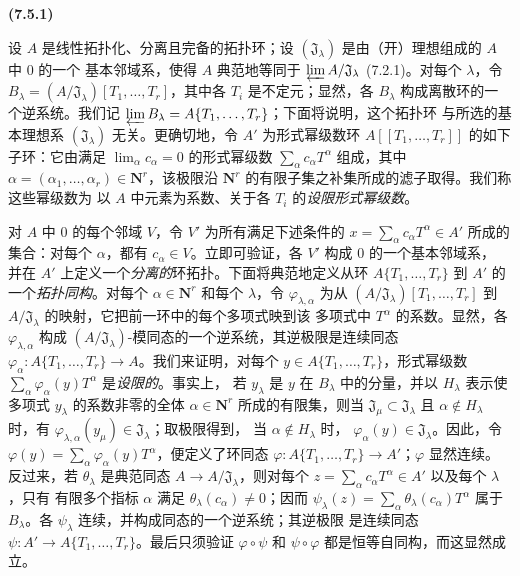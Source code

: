 \documentclass[UTF8,fontset=none,11pt,oneside,openany]{ctexbook}
\newenvironment{env}[1][]{%
  \par\medskip\noindent\textbf{(#1)}\ %
}{\par}
\newcommand{\oldpage}[2][]{%
  \hypertarget{ega-source-page-#1-#2}{}%
  \marginnote{\scriptsize\textbf{#1}~|~#2}\ignorespaces}
\let\EGAOriginalLabel\label
\renewcommand{\label}[1]{\phantomsection\EGAOriginalLabel{#1}}
\begin{document}
\begin{env}[7.5.1]
\label{0.7.5.1-fr}
设 $A$ 是线性拓扑化、分离且完备的拓扑环；设
$(\mathfrak J_\lambda)$ 是由（开）理想组成的 $A$ 中 $0$ 的一个
基本邻域系，使得 $A$ 典范地等同于
$\varprojlim A/\mathfrak J_\lambda$ (7.2.1)。对每个 $\lambda$，令
$B_\lambda=(A/\mathfrak J_\lambda)[T_1,\ldots,T_r]$，其中各 $T_i$
是不定元；显然，各 $B_\lambda$ 构成离散环的一个逆系统。我们记
$\varprojlim B_\lambda=A\{T_1,\ldots,T_r\}$；下面将说明，这个拓扑环
与所选的基本理想系 $(\mathfrak J_\lambda)$ 无关。更确切地，令 $A'$
为形式幂级数环 $A[\![T_1,\ldots,T_r]\!]$ 的如下子环：它由满足
$\lim_\alpha c_\alpha=0$ 的形式幂级数
$\sum_\alpha c_\alpha T^\alpha$ 组成，其中
$\alpha=(\alpha_1,\ldots,\alpha_r)\in\mathbf{N}^r$，该极限沿
$\mathbf{N}^r$ 的有限子集之补集所成的滤子取得。我们称这些幂级数为
以 $A$ 中元素为系数、关于各 $T_i$ 的\emph{设限形式幂级数}。

\oldpage[0\textsubscript{I}]{70}

对 $A$ 中 $0$ 的每个邻域 $V$，令 $V'$ 为所有满足下述条件的
$x=\sum_\alpha c_\alpha T^\alpha\in A'$ 所成的集合：对每个 $\alpha$，都有
$c_\alpha\in V$。立即可验证，各 $V'$ 构成 $0$ 的一个基本邻域系，
并在 $A'$ 上定义一个\emph{分离的}环拓扑。下面将典范地定义从环
$A\{T_1,\ldots,T_r\}$ 到 $A'$ 的一个\emph{拓扑同构}。对每个
$\alpha\in\mathbf{N}^r$ 和每个 $\lambda$，令
$\varphi_{\lambda,\alpha}$ 为从
$(A/\mathfrak J_\lambda)[T_1,\ldots,T_r]$ 到
$A/\mathfrak J_\lambda$ 的映射，它把前一环中的每个多项式映到该
多项式中 $T^\alpha$ 的系数。显然，各 $\varphi_{\lambda,\alpha}$
构成 $(A/\mathfrak J_\lambda)$-模同态的一个逆系统，其逆极限是连续同态
$\varphi_\alpha:A\{T_1,\ldots,T_r\}\to A$。我们来证明，对每个
$y\in A\{T_1,\ldots,T_r\}$，形式幂级数
$\sum_\alpha\varphi_\alpha(y)T^\alpha$ 是\emph{设限的}。事实上，
若 $y_\lambda$ 是 $y$ 在 $B_\lambda$ 中的分量，并以 $H_\lambda$
表示使多项式 $y_\lambda$ 的系数非零的全体
$\alpha\in\mathbf{N}^r$ 所成的有限集，则当
$\mathfrak J_\mu\subset\mathfrak J_\lambda$ 且
$\alpha\notin H_\lambda$ 时，有
$\varphi_{\lambda,\alpha}(y_\mu)\in\mathfrak J_\lambda$；取极限得到，
当 $\alpha\notin H_\lambda$ 时，
$\varphi_\alpha(y)\in\mathfrak J_\lambda$。因此，令
$\varphi(y)=\sum_\alpha\varphi_\alpha(y)T^\alpha$，便定义了环同态
$\varphi:A\{T_1,\ldots,T_r\}\to A'$；$\varphi$ 显然连续。反过来，若
$\theta_\lambda$ 是典范同态 $A\to A/\mathfrak J_\lambda$，则对每个
$z=\sum_\alpha c_\alpha T^\alpha\in A'$ 以及每个 $\lambda$，只有
有限多个指标 $\alpha$ 满足 $\theta_\lambda(c_\alpha)\neq0$；因而
$\psi_\lambda(z)=\sum_\alpha\theta_\lambda(c_\alpha)T^\alpha$ 属于
$B_\lambda$。各 $\psi_\lambda$ 连续，并构成同态的一个逆系统；其逆极限
是连续同态 $\psi:A'\to A\{T_1,\ldots,T_r\}$。最后只须验证
$\varphi\circ\psi$ 和 $\psi\circ\varphi$ 都是恒等自同构，而这显然成立。
\end{env}
\end{document}
